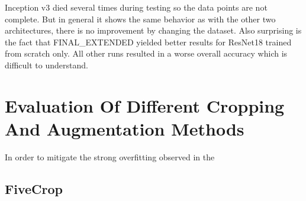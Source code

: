 \begin{table}[h] \centering
{}
\caption{Dataset variations with Inception v3. The first group shows how the datasets performed when trained from scratch whereas the second group shows how the datasets performed with pre-training. FINAL\_C\_B died for the non-pre-trained twice. Only one datapoint used.}
\label{tbl:inceptionv3_dataset}
\end{table}

Inception v3 died several times during testing so the data points are not complete. But in general it shows the same behavior as with the other two architectures, there is no improvement by changing the dataset. Also surprising is the fact that FINAL\_EXTENDED yielded better results for ResNet18 trained from scratch only. All other runs resulted in a worse overall accuracy which is difficult to understand.













\section{Evaluation Of Different Cropping And Augmentation Methods}

In order to mitigate the strong overfitting observed in the 

\subsection{FiveCrop}

